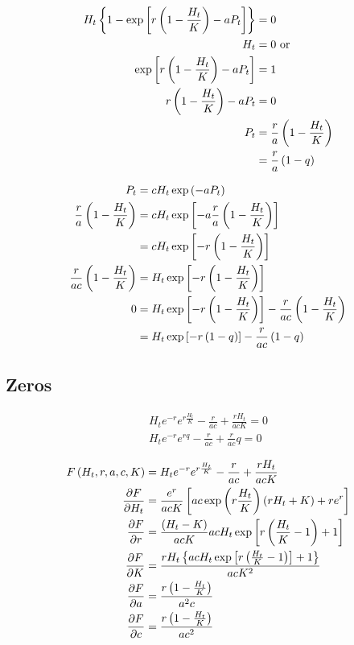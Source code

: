 \documentclass{article}
\begin{document}
\begin{align*}
    H_t\left\{1 - \exp\left[r\left(1-\frac{H_t}{K}\right) - aP_t\right]\right\} &= 0\\
    H_t &= 0 \text{ or}\\
    \exp\left[r\left(1-\frac{H_t}{K}\right) - aP_t\right] &= 1\\
    r\left(1-\frac{H_t}{K}\right) - aP_t &= 0\\
    P_t &= \frac{r}{a}\left(1-\frac{H_t}{K}\right)\\
        &= \frac{r}{a}\left(1-q\right)
\end{align*}

\begin{align*}
    P_t &= c H_t \exp\left(-aP_t\right)\\
    \frac{r}{a}\left(1-\frac{H_t}{K}\right) &= c H_t \exp\left[-a \frac{r}{a}\left(1-\frac{H_t}{K}\right)\right]\\
    &= c H_t \exp\left[-r\left(1-\frac{H_t}{K}\right)\right]\\
    \frac{r}{ac}\left(1-\frac{H_t}{K}\right) &= H_t \exp\left[-r\left(1-\frac{H_t}{K}\right)\right]\\
    0 &= H_t\exp\left[-r\left(1-\frac{H_t}{K}\right)\right] - \frac{r}{ac}\left(1-\frac{H_t}{K}\right)\\
      &= H_t\exp\left[-r\left(1-q\right)\right]-\frac{r}{ac}\left(1-q\right)
\end{align*}

\subsection{Zeros}

\begin{align*}
    H_te^{-r}e^{r\frac{H_t}{K}} - \frac{r}{ac} + \frac{rH_t}{acK} = 0\\
    H_te^{-r}e^{rq} - \frac{r}{ac} + \frac{r}{ac} q = 0
\end{align*}

\begin{align*}
    F\left(H_t, r, a, c, K\right) &= H_te^{-r}e^{r\frac{H_t}{K}}-\frac{r}{ac}+\frac{rH_t}{acK}\\
    \frac{\partial F}{\partial H_t} &= \frac{e^r}{acK} \left[ a c \exp\left(r \frac{H_t}{K}\right)\left(r H_t + K\right) + r e^r\right]\\
    \frac{\partial F}{\partial r} &= \frac{\left(H_t - K\right)}{acK} acH_t\exp\left[r\left(\frac{H_t}{K} - 1\right)+1\right]\\
    \frac{\partial F}{\partial K} &= \frac{r H_t \left\{a c H_t \exp\left[r\left(\frac{H_t}{K}-1\right)\right] + 1\right\}}{acK^2}\\
    \frac{\partial F}{\partial a} &= \frac{r\left(1-\frac{H_t}{K}\right)}{a^2c}\\
    \frac{\partial F}{\partial c} &= \frac{r\left(1-\frac{H_t}{K}\right)}{ac^2}
\end{align*}
\end{document}
